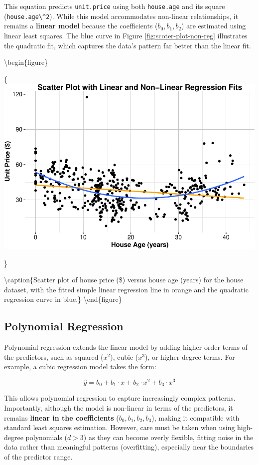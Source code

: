 \documentclass[
]{book}
\newcommand{\passthrough}[1]{#1}
\theoremstyle{definition}
\theoremstyle{definition}
\theoremstyle{definition}
\theoremstyle{definition}
\theoremstyle{remark}
\begin{document}
This equation predicts \passthrough{\lstinline!unit.price!} using both \passthrough{\lstinline!house.age!} and its square (\passthrough{\lstinline!house.age\^2!}). While this model accommodates non-linear relationships, it remains a \textbf{linear model} because the coefficients (\(b_0, b_1, b_2\)) are estimated using linear least squares. The blue curve in Figure \ref{fig:scoter-plot-non-reg} illustrates the quadratic fit, which captures the data's pattern far better than the linear fit.

\textbackslash begin\{figure\}

\{\centering \includegraphics[width=1\linewidth]{regression_files/figure-latex/scoter-plot-non-reg-1}

\}

\textbackslash caption\{Scatter plot of house price (\$) versus house age (years) for the house dataset, with the fitted simple linear regression line in orange and the quadratic regression curve in blue.\}\label{fig:scoter-plot-non-reg}
\textbackslash end\{figure\}

\subsection{Polynomial Regression}\label{polynomial-regression}

Polynomial regression extends the linear model by adding higher-order terms of the predictors, such as squared (\(x^2\)), cubic (\(x^3\)), or higher-degree terms. For example, a cubic regression model takes the form:

\[
\hat{y} = b_0 + b_1 \cdot x + b_2 \cdot x^2 + b_3 \cdot x^3
\]

This allows polynomial regression to capture increasingly complex patterns. Importantly, although the model is non-linear in terms of the predictors, it remains \textbf{linear in the coefficients} (\(b_0, b_1, b_2, b_3\)), making it compatible with standard least squares estimation. However, care must be taken when using high-degree polynomials (\(d > 3\)) as they can become overly flexible, fitting noise in the data rather than meaningful patterns (overfitting), especially near the boundaries of the predictor range.
\end{document}
